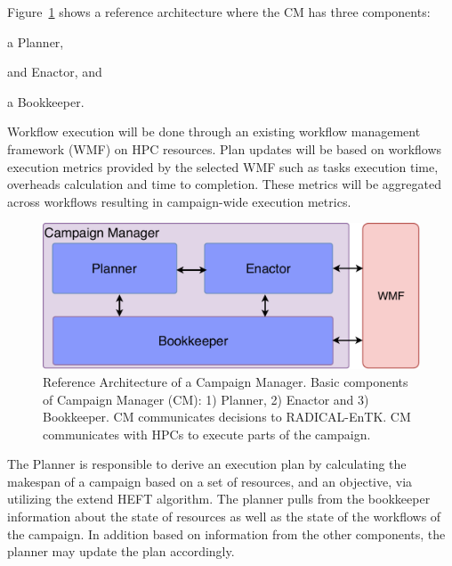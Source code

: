 Figure~\ref{fig:refarch} shows a reference architecture where the CM has three components:
\begin{inparaenum}[(1)]
\item a Planner,
\item and Enactor, and
\item a Bookkeeper. 
\end{inparaenum}
Workflow execution will be done through an existing workflow management framework (WMF) on HPC resources.
Plan updates will be based on workflows execution metrics provided by the selected WMF such as tasks execution time, overheads calculation and time to completion.
These metrics will be aggregated across workflows resulting in campaign-wide execution metrics.

\begin{figure}[t]
    \centering
    \includegraphics[width=.95\textwidth]{figures/CEM_design.pdf}
    \caption{Reference Architecture of a Campaign Manager. Basic 
    components of Campaign Manager (CM): 1) Planner, 2) Enactor and 3) Bookkeeper. 
    CM communicates decisions to RADICAL-EnTK. CM communicates with HPCs to 
    execute parts of the campaign.}\label{fig:refarch}
\end{figure}

The Planner is responsible to derive an execution plan by calculating the makespan of a campaign based on a set of resources, and an objective, via utilizing the extend HEFT algorithm. 
The planner pulls from the bookkeeper information about the state of resources as well as the state of the workflows of the campaign.
In addition based on information from the other components, the planner may update the plan accordingly. 

